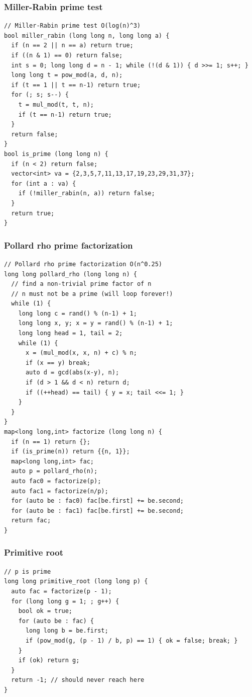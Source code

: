 \documentclass[10pt,letterpaper,landscape]{article}
\begin{document}
\begin{multicols}{2}
\subsubsection{Miller-Rabin prime test}
\begin{lstlisting}
// Miller-Rabin prime test O(log(n)^3)
bool miller_rabin (long long n, long long a) {
  if (n == 2 || n == a) return true;
  if ((n & 1) == 0) return false;
  int s = 0; long long d = n - 1; while (!(d & 1)) { d >>= 1; s++; }
  long long t = pow_mod(a, d, n);
  if (t == 1 || t == n-1) return true;
  for (; s; s--) {
    t = mul_mod(t, t, n);
    if (t == n-1) return true;
  }
  return false;
}
bool is_prime (long long n) {
  if (n < 2) return false;
  vector<int> va = {2,3,5,7,11,13,17,19,23,29,31,37};
  for (int a : va) {
    if (!miller_rabin(n, a)) return false;
  }
  return true;
}
\end{lstlisting}
\subsubsection{Pollard rho prime factorization}
\begin{lstlisting}
// Pollard rho prime factorization O(n^0.25)
long long pollard_rho (long long n) {
  // find a non-trivial prime factor of n
  // n must not be a prime (will loop forever!)
  while (1) {
    long long c = rand() % (n-1) + 1;
    long long x, y; x = y = rand() % (n-1) + 1;
    long long head = 1, tail = 2;
    while (1) {
      x = (mul_mod(x, x, n) + c) % n;
      if (x == y) break;
      auto d = gcd(abs(x-y), n);
      if (d > 1 && d < n) return d;
      if ((++head) == tail) { y = x; tail <<= 1; }
    }
  }
}
map<long long,int> factorize (long long n) {
  if (n == 1) return {};
  if (is_prime(n)) return {{n, 1}};
  map<long long,int> fac;
  auto p = pollard_rho(n);
  auto fac0 = factorize(p);
  auto fac1 = factorize(n/p);
  for (auto be : fac0) fac[be.first] += be.second;
  for (auto be : fac1) fac[be.first] += be.second;
  return fac;
}
\end{lstlisting}
\subsubsection{Primitive root}
\begin{lstlisting}
// p is prime
long long primitive_root (long long p) {
  auto fac = factorize(p - 1);
  for (long long g = 1; ; g++) {
    bool ok = true;
    for (auto be : fac) {
      long long b = be.first;
      if (pow_mod(g, (p - 1) / b, p) == 1) { ok = false; break; }
    }
    if (ok) return g;
  }
  return -1; // should never reach here
}
\end{lstlisting}

\end{multicols}
\end{document}

